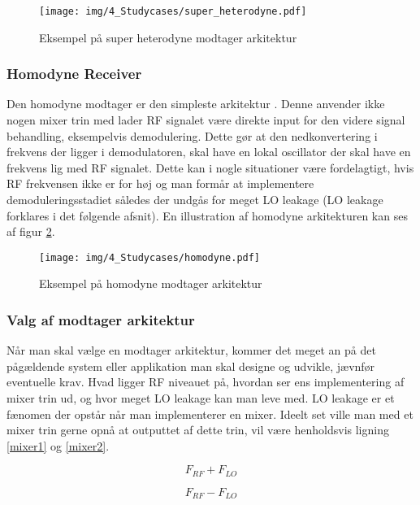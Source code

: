 \begin{appendices}
\begin{figure}[H]
	\centering{}
	\texttt{[image: img/4\_Studycases/super\_heterodyne.pdf]}
	\caption{Eksempel på super heterodyne modtager arkitektur}
	\label{fig:super_heterodyne}
\end{figure} 

\subsubsection{Homodyne Receiver}
Den homodyne modtager er den simpleste arkitektur \cite{receiver-architecture}. Denne anvender ikke nogen mixer trin med lader RF signalet være direkte input for den videre signal behandling, eksempelvis demodulering. Dette gør at den nedkonvertering i frekvens der ligger i demodulatoren, skal have en lokal oscillator der skal have en frekvens lig med RF signalet. Dette kan i nogle situationer være fordelagtigt, hvis RF frekvensen ikke er for høj og man formår at implementere demoduleringsstadiet således der undgås for meget LO leakage (LO leakage forklares i det følgende afsnit). En illustration af homodyne arkitekturen kan ses af figur \ref{fig:homodyne}.

\begin{figure}[H]
	\centering{}
	\texttt{[image: img/4\_Studycases/homodyne.pdf]}
	\caption{Eksempel på homodyne modtager arkitektur}
	\label{fig:homodyne}
\end{figure} 

\subsubsection{Valg af modtager arkitektur}
Når man skal vælge en modtager arkitektur, kommer det meget an på det pågældende system eller applikation man skal designe og udvikle, jævnfør eventuelle krav. Hvad ligger RF niveauet på, hvordan ser ens implementering af mixer trin ud, og hvor meget LO leakage kan man leve med. \newline
LO leakage er et fænomen der opstår når man implementerer en mixer. Ideelt set ville man med et mixer trin gerne opnå at outputtet af dette trin, vil være henholdsvis ligning \ref{mixer1} og \ref{mixer2}.

\begin{equation} \label{mixer1}
F_{RF} + F_{LO}
\end{equation}

\begin{equation} \label{mixer2}
F_{RF} - F_{LO}
\end{equation}


\end{appendices}

